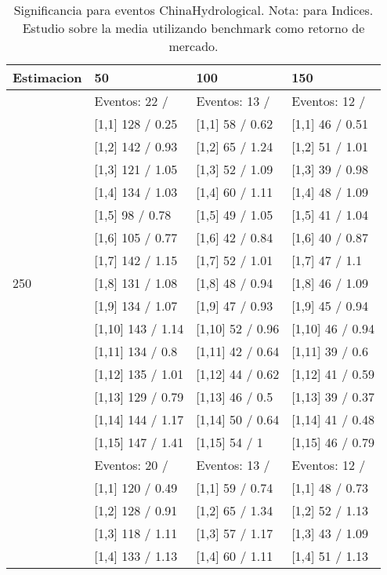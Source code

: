 \begin{table}

\caption{Significancia para eventos ChinaHydrological. Nota: para Indices. Estudio sobre la media utilizando benchmark como retorno de mercado.}
\centering
\begin{tabular}[t]{llll}
\toprule
Estimacion & 50 & 100 & 150\\
\midrule
 & Eventos:  22 / & Eventos:  13 / & Eventos:  12 /\\
 & {}[1,1] 128  / 0.25 & {}[1,1] 58  / 0.62 & {}[1,1] 46  / 0.51\\
 & {}[1,2] 142  / 0.93 & {}[1,2] 65  / 1.24 & {}[1,2] 51  / 1.01\\
 & {}[1,3] 121  / 1.05 & {}[1,3] 52  / 1.09 & {}[1,3] 39  / 0.98\\
 & {}[1,4] 134  / 1.03 & {}[1,4] 60  / 1.11 & {}[1,4] 48  / 1.09\\
\addlinespace
 & {}[1,5] 98  / 0.78 & {}[1,5] 49  / 1.05 & {}[1,5] 41  / 1.04\\
 & {}[1,6] 105  / 0.77 & {}[1,6] 42  / 0.84 & {}[1,6] 40  / 0.87\\
 & {}[1,7] 142  / 1.15 & {}[1,7] 52  / 1.01 & {}[1,7] 47  / 1.1\\
250 & {}[1,8] 131  / 1.08 & {}[1,8] 48  / 0.94 & {}[1,8] 46  / 1.09\\
 & {}[1,9] 134  / 1.07 & {}[1,9] 47  / 0.93 & {}[1,9] 45  / 0.94\\
\addlinespace
 & {}[1,10] 143  / 1.14 & {}[1,10] 52  / 0.96 & {}[1,10] 46  / 0.94\\
 & {}[1,11] 134  / 0.8 & {}[1,11] 42  / 0.64 & {}[1,11] 39  / 0.6\\
 & {}[1,12] 135  / 1.01 & {}[1,12] 44  / 0.62 & {}[1,12] 41  / 0.59\\
 & {}[1,13] 129  / 0.79 & {}[1,13] 46  / 0.5 & {}[1,13] 39  / 0.37\\
 & {}[1,14] 144  / 1.17 & {}[1,14] 50  / 0.64 & {}[1,14] 41  / 0.48\\
\addlinespace
 & {}[1,15] 147  / 1.41 & {}[1,15] 54  / 1 & {}[1,15] 46  / 0.79\\
 & Eventos:  20 / & Eventos:  13 / & Eventos:  12 /\\
 & {}[1,1] 120  / 0.49 & {}[1,1] 59  / 0.74 & {}[1,1] 48  / 0.73\\
 & {}[1,2] 128  / 0.91 & {}[1,2] 65  / 1.34 & {}[1,2] 52  / 1.13\\
 & {}[1,3] 118  / 1.11 & {}[1,3] 57  / 1.17 & {}[1,3] 43  / 1.09\\
\addlinespace
 & {}[1,4] 133  / 1.13 & {}[1,4] 60  / 1.11 & {}[1,4] 51  / 1.13\\

\end{tabular}
\end{table}
